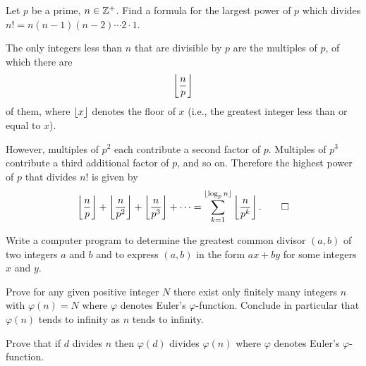  Let $p$ be a prime, $n\in\mathbb{Z}^+$. Find a formula for the
largest power of $p$ which divides $n! = n(n-1)(n-2)\cdots2\cdot1$.
\begin{solution}
  The only integers less than $n$ that are divisible by $p$ are the
  multiples of $p$, of which there are
  \begin{equation*}
    \left\lfloor{\frac{n}{p}}\right\rfloor
  \end{equation*}
  of them, where $\lfloor{x}\rfloor$ denotes the floor of $x$ (i.e., the
  greatest integer less than or equal to $x$).

  However, multiples of $p^2$ each contribute a second factor of
  $p$. Multiples of $p^3$ contribute a third additional factor of $p$,
  and so on. Therefore the highest power of $p$ that divides $n!$ is
  given by
  \begin{equation*}
    \left\lfloor{\frac{n}{p}}\right\rfloor + \left\lfloor{\frac{n}{p^2}}\right\rfloor + \left\lfloor{\frac{n}{p^3}}\right\rfloor
    + \cdots
    = \sum_{k=1}^{\lfloor{\log_pn}\rfloor}\left\lfloor{\frac{n}{p^k}}\right\rfloor.\qedhere
  \end{equation*}
\end{solution}

 Write a computer program to determine the greatest common
divisor $(a, b)$ of two integers $a$ and $b$ and to express $(a, b)$
in the form $ax+by$ for some integers $x$ and $y$.

 Prove for any given positive integer $N$ there exist
only finitely many integers $n$ with $\varphi(n) = N$ where $\varphi$
denotes Euler's $\varphi$-function. Conclude in particular that
$\varphi(n)$ tends to infinity as $n$ tends to infinity.

 Prove that if $d$ divides $n$ then $\varphi(d)$ divides
$\varphi(n)$ where $\varphi$ denotes Euler's $\varphi$-function.
